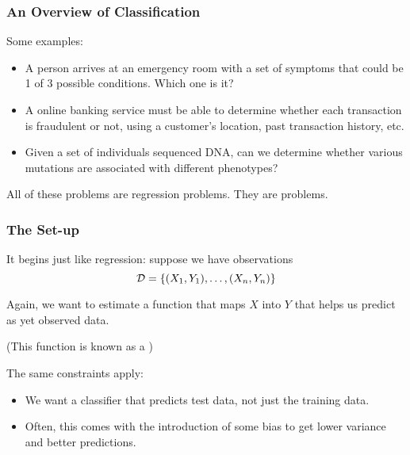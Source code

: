 \documentclass[12pt]{beamer}
\begin{document}
\title{}
\subtitle{\classTitle}
\date{}



\begin{frame}
\maketitle
%
\organization
%
\end{frame}

\begin{frame}[fragile]
\frametitle{An Overview of  Classification}
Some examples:
\begin{itemize}
\item A person arrives at an emergency room with a set of symptoms that could be 1 of 3
possible conditions.  Which one is it?
\item A online banking service must be able to determine whether each transaction
is fraudulent or not, using a customer's location, past transaction history, etc.
\item Given a set of individuals sequenced DNA, can we determine whether various mutations
are associated with different phenotypes?
\end{itemize}
\vsp

All of these problems are  regression problems.  They are  problems.
\end{frame}

\begin{frame}[fragile]
\frametitle{The Set-up}
It begins just like regression:  suppose we have observations
\[
\mathcal{D} = \{(X_1,Y_1),\ldots,(X_n,Y_n)\}
\]
\vsp

Again, we want to estimate a function that maps $X$ into $Y$ that helps us predict
as yet observed data.  

{\scriptsize (This function is known as a )}

\vsp
The same constraints apply:
\begin{itemize}
\item We want a classifier that predicts test data, not just the training data.
\item Often, this comes with the introduction of some bias to get lower variance and better 
predictions.
\end{itemize}
\end{frame}
\end{document}
